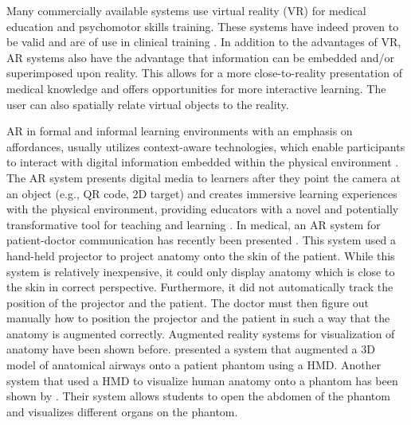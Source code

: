 Many commercially available systems use virtual reality (VR) for medical education and psychomotor skills training. These systems have indeed proven to be valid and are of use in clinical training \cite{Lewis2011,Thijssen2010,VanDongen2011}. In addition to the advantages of VR, AR systems also have the advantage that information can be embedded and/or superimposed upon reality. This allows for a more close-to-reality presentation of medical knowledge and offers opportunities for more interactive learning. The user can also spatially relate virtual objects to the reality. 

AR in formal and informal learning environments with an emphasis on affordances, usually utilizes context-aware technologies, which enable participants to interact with digital information embedded within the physical environment \cite{Dunleavy2008}. The AR system presents digital media to learners after they point the camera at an object (e.g., QR code, 2D target) and creates immersive learning experiences with the physical environment, providing educators with a novel and potentially transformative tool for teaching and learning \cite{Dede2009,Johnson2011}. 
In medical, an AR system for patient-doctor communication has recently been presented \cite{Ni2011}. This system used a hand-held projector to project anatomy onto the skin of the patient. While this system is relatively inexpensive, it could only display anatomy which is close to the skin in correct perspective. Furthermore, it did not automatically track the position of the projector and the patient. The doctor must then figure out manually how to position the projector and the patient in such a way that the anatomy is augmented correctly.
Augmented reality systems for visualization of anatomy have been shown before. \cite{Davis2002} presented a system that augmented a 3D model of anatomical airways onto a patient phantom using a HMD. Another system that used a HMD to visualize human anatomy onto a phantom has been shown by \cite{Juan2008}. Their system allows students to open the abdomen of the phantom and visualizes different organs on the phantom.

